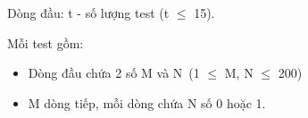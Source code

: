Dòng đầu: t - số lượng test (t  $\le$  15).

Mỗi test gồm:
\begin{itemize}
	\item Dòng đầu chứa 2 số M và N (1  $\le$  M, N  $\le$  200)
	\item M dòng tiếp, mỗi dòng chứa N số 0 hoặc 1.
\end{itemize}